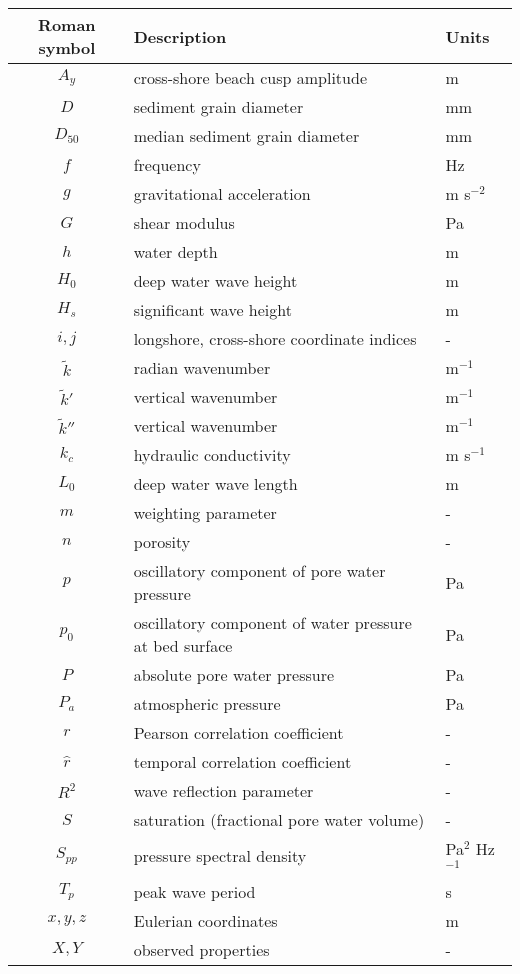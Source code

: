 \setlongtables
\begin{longtable}{cll}
	\hline
	Roman symbol & Description & Units\\
	\hline
	\endhead
	\hline
	\endfoot
	
	$A_y$ & cross-shore beach cusp amplitude & m\\
	$D$ & sediment grain diameter & mm\\
	$D_{50}$ & median sediment grain diameter & mm\\
	$f$ & frequency & Hz\\
	$g$ & gravitational acceleration & m s$^{-2}$\\
	$G$ & shear modulus & Pa\\
	$h$ & water depth & m\\
	$H_0$ & deep water wave height & m\\
	$H_s$ & significant wave height & m\\
	$i,j$ & longshore, cross-shore coordinate indices & -\\
	$\tilde{k}$ & radian wavenumber & m$^{-1}$\\
	$\tilde{k}'$ & \citet{Yamamoto_etal1978} vertical wavenumber & m$^{-1}$\\
	$\tilde{k}''$ & \citet{Yamamoto_etal1978} vertical wavenumber & m$^{-1}$\\
	$k_c$ & hydraulic conductivity & m s$^{-1}$\\
	$L_0$ & deep water wave length & m\\
	$m$ & \citet{Yamamoto_etal1978} weighting parameter & -\\
	$n$ & porosity & -\\
	$p$ & oscillatory component of pore water pressure & Pa\\
	$p_0$ & oscillatory component of water pressure at bed surface & Pa\\
	$P$ & absolute pore water pressure & Pa\\
	$P_a$ & atmospheric pressure & Pa\\
	$r$ & Pearson correlation coefficient & -\\
	$\hat{r}$ & temporal correlation coefficient & -\\
	$R^2$ & wave reflection parameter & -\\
	$S$ & saturation (fractional pore water volume) & -\\
	$S_{pp}$ & pressure spectral density & Pa$^2$ Hz$^{-1}$\\
	$T_p$ & peak wave period & s\\
	$x,y,z$ & Eulerian coordinates & m\\
	$X,Y$ & observed properties & -\\	
	
	\hline
\end{longtable}

